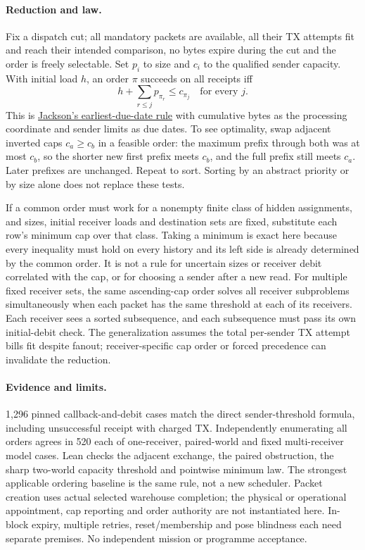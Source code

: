 \documentclass[11pt]{article}
\begin{document}
\paragraph{Reduction and law.}
Fix a dispatch cut; all mandatory packets are available, all their TX
attempts fit and reach their intended comparison, no bytes expire
during the cut and the order is freely selectable. Set \(p_i\) to size
and \(c_i\) to the qualified sender capacity. With initial load \(h\),
an order \(\pi\) succeeds on all receipts iff
\[
              h+\sum_{r\le j}p_{\pi_r}\le c_{\pi_j}
              \quad\text{for every }j .
\]
This is \href{https://ntrl.ntis.gov/NTRL/dashboard/searchResults/titleDetail/AD152722.xhtml}{Jackson's earliest-due-date rule}
with cumulative bytes as the processing coordinate and sender limits
as due dates. To see optimality, swap adjacent inverted caps \(c_a\ge c_b\)
in a feasible order: the maximum prefix through both was at most \(c_b\),
so the shorter new first prefix meets \(c_b\), and the full prefix still
meets \(c_a\). Later prefixes are unchanged. Repeat to sort. Sorting by
an abstract priority or by size alone does not replace these tests.

If a common order must work for a nonempty finite class of hidden
assignments, and sizes, initial receiver loads and destination sets are
fixed, substitute each row's minimum cap over that class. Taking a minimum
is exact here because every inequality must hold on every history and
its left side is already determined by the common order. It is not a
rule for uncertain sizes or receiver debit correlated with the cap, or
for choosing a sender after a new read. For multiple fixed receiver
sets, the same ascending-cap order solves all receiver subproblems
simultaneously when each packet has the same threshold at each of its
receivers. Each receiver sees a sorted subsequence, and each subsequence
must pass its own initial-debit check. The generalization assumes the
total per-sender TX attempt bills fit despite fanout; receiver-specific
cap order or forced precedence can invalidate the reduction.

\paragraph{Evidence and limits.}
1,296 pinned callback-and-debit cases match the direct sender-threshold
formula, including unsuccessful receipt with charged TX. Independently
enumerating all orders agrees in 520 each of one-receiver, paired-world
and fixed multi-receiver model cases. Lean checks the adjacent exchange,
the paired obstruction, the sharp two-world capacity threshold and
pointwise minimum law. The strongest applicable ordering baseline is
the same rule, not a new scheduler. Packet creation uses actual selected
warehouse completion; the physical or operational appointment, cap
reporting and order authority are not instantiated here. In-block
expiry, multiple retries, reset/membership and pose blindness each need
separate premises. No independent mission or programme acceptance.
\end{document}
